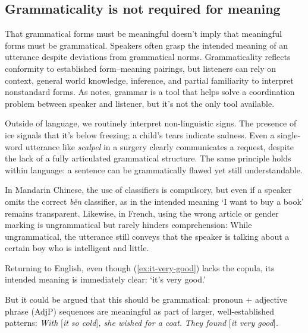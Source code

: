\subsection{Grammaticality is not required for meaning}\label{sec:ungrammatical-meaning}



That grammatical forms must be meaningful doesn't imply that meaningful forms must be grammatical. Speakers often grasp the intended meaning of an utterance despite deviations from grammatical norms. Grammaticality reflects conformity to established form--meaning pairings, but listeners can rely on context, general world knowledge, inference, and partial familiarity to interpret nonstandard forms. As \textcite[2]{scottphillips2024communication} notes, grammar is a tool that helps solve a coordination problem between speaker and listener, but it's not the only tool available.

Outside of language, we routinely interpret non-linguistic signs. The presence of ice signals that it's below freezing; a child's tears indicate sadness. Even a single-word utterance like \textit{scalpel} in a surgery clearly communicates a request, despite the lack of a fully articulated grammatical structure. The same principle holds within language: a sentence can be grammatically flawed yet still understandable.

In Mandarin Chinese, the use of classifiers is compulsory, but even if a speaker omits the correct \textit{běn} classifier, as in
\z
the intended meaning `I want to buy a book’ remains transparent. Likewise, in French, using the wrong article or gender marking is ungrammatical but rarely hinders comprehension:
\z
While ungrammatical, the utterance still conveys that the speaker is talking about a certain boy who is intelligent and little.

Returning to English, even though (\ref{ex:it-very-good}) lacks the copula, its intended meaning is immediately clear: `it's very good.’ 

\label{ex:it-very-good}
\z

\noindent But it could be argued that this should be grammatical: pronoun + adjective phrase (AdjP) sequences are meaningful as part of larger, well-established patterns:
\ea
    \ea \textit{With }[\textit{it so cold}]\textit{, she wished for a coat.}
    \ex \textit{They found }[\textit{it very good}]\textit{.}
    \z
\z

